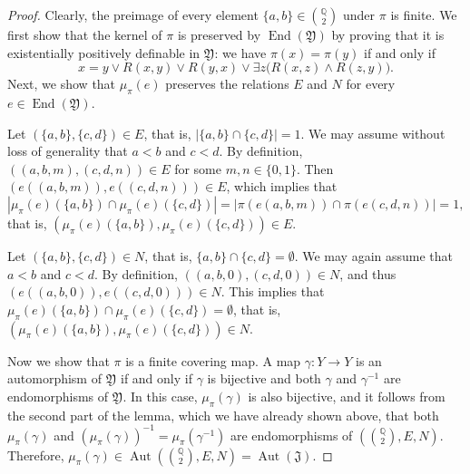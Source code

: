 \documentclass{amsart}
\theoremstyle{definition}
\theoremstyle{remark}
\numberwithin{equation}{section}
\newcommand{\aut}{\operatorname{Aut}}
\newcommand{\en}{\operatorname{End}}
\newcommand{\eend}{\operatorname{End}}
\newcommand{\upairs}{{{\mathbb Q}\choose 2}}
\newcommand{\john}{\mathfrak{J}}
\newcommand{\fb}{\mathfrak{B}}
\newcommand{\fy}{\mathfrak{Y}}
\begin{document}
\begin{proof}
    Clearly, the preimage of every element $\{a,b\} \in \upairs$ under $\pi$ is finite. We first show that the kernel of $\pi$ is preserved by $\en(\fy)$ by proving that it is existentially positively definable in $\fy$: 
    we have $\pi(x) = \pi(y)$ if and only if 
    $$x=y \vee R(x,y) \vee R(y,x) \vee \exists z \big (R(x,z) \wedge R(z,y) \big ).$$
    Next, we show that $\mu_{\pi}(e)$ preserves the relations $E$ and $N$ for every $e\in \en(\fy)$.

	Let $(\{a,b\},\{c,d\})\in E$, that is, $|\{a,b\}\cap \{c,d\}|=1$. We may assume without loss of generality that $a<b$ and $c<d$. By definition, $((a,b,m),(c,d,n))\in E$ for some $m,n\in \{0,1\}$. Then $(e((a,b,m)),e((c,d,n)))\in E$, which implies that $$|\mu_{\pi}(e)(\{a,b\})\cap \mu_{\pi}(e)(\{c,d\})| = |\pi(e(a,b,m)) \cap \pi(e(c,d,n))| =1,$$
    that is,  $(\mu_{\pi}(e)(\{a,b\}),\mu_{\pi}(e)(\{c,d\}))\in E$.

	Let $(\{a,b\},\{c,d\})\in N$, that is, $\{a,b\}\cap \{c,d\}=\emptyset$. We may again assume that $a<b$ and $c<d$. By definition, $((a,b,0),(c,d,0))\in N$, and thus $(e((a,b,0)),e((c,d,0)))\in N$. This implies that $\mu_{\pi}(e)(\{a,b\})\cap \mu_{\pi}(e)(\{c,d\})=\emptyset$, that is, $(\mu_{\pi}(e)(\{a,b\}),\mu_{\pi}(e)(\{c,d\}))\in N$.
    
	Now we show that $\pi$ is a finite covering map. A map $\gamma \colon Y \to Y$ is an automorphism of $\fy$ if and only if $\gamma$ is bijective and both $\gamma$ and $\gamma^{-1}$ are 
    endomorphisms of $\fy$. In this case, $\mu_{\pi}(\gamma)$ is also bijective, and it follows from the second part of the lemma, which we have already shown above, that both $\mu_{\pi}(\gamma)$ and $(\mu_{\pi}(\gamma))^{-1}=\mu_{\pi}(\gamma^{-1})$ are endomorphisms of $(\upairs,E,N)$. Therefore,  $\mu_{\pi}(\gamma)\in \aut(\upairs,E,N)=\aut(\john)$. 
    

\end{proof}
\end{document}
